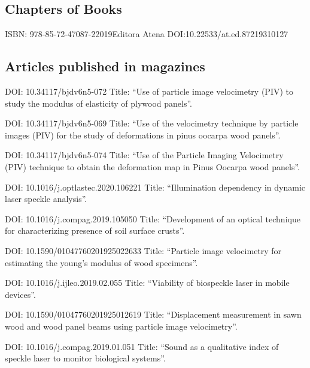 \documentclass[11pt,a4paper,sans]{moderncv} %
\begin{document}
\subsection{Chapters of Books}
	      {ISBN: 978-85-72-47087-2}{2019}{Editora Atena}
	      {DOI:10.22533/at.ed.87219310127}

\subsection{Articles published in magazines}

	      {DOI: 10.34117/bjdv6n5-072}{}{}
	      {Title: ``Use of particle image velocimetry (PIV) to study the modulus of elasticity of plywood panels''.}

	      {DOI: 10.34117/bjdv6n5-069}{}{}
	      {Title: ``Use of the velocimetry technique by particle images (PIV) for the study of deformations in pinus oocarpa wood panels''.}

	      {DOI: 10.34117/bjdv6n5-074}{}{}
	      {Title: ``Use of the Particle Imaging Velocimetry (PIV) technique to obtain the deformation map in Pinus Oocarpa wood panels''.}

	      {DOI: 10.1016/j.optlastec.2020.106221}{}{}
	      {Title: ``Illumination dependency in dynamic laser speckle analysis''.}

	      {DOI: 10.1016/j.compag.2019.105050}{}{}
	      {Title: ``Development of an optical technique for characterizing presence of soil surface crusts''.}

	      {DOI: 10.1590/01047760201925022633}{}{}
	      {Title: ``Particle image velocimetry for estimating the young’s modulus of wood specimens''.}

	      {DOI: 10.1016/j.ijleo.2019.02.055}{}{}
	      {Title: ``Viability of biospeckle laser in mobile devices''.}

	      {DOI: 10.1590/01047760201925012619}{}{}
	      {Title: ``Displacement measurement in sawn wood and wood panel beams using particle image velocimetry''.}

	      {DOI: 10.1016/j.compag.2019.01.051}{}{}
	      {Title: ``Sound as a qualitative index of speckle laser to monitor biological systems''.}
\end{document}
